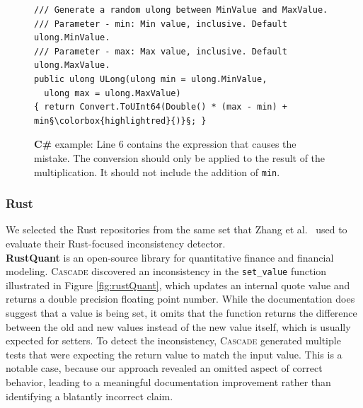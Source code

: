 \documentclass[acmsmall, screen]{acmart}
\newcommand{\tool}{\textsc{Cascade}\xspace}
\begin{document}

% 

\begin{figure}
    \centering
    \begin{lstlisting}[language=CSharp, escapechar=§]
/// Generate a random ulong between MinValue and MaxValue.
/// Parameter - min: Min value, inclusive. Default ulong.MinValue.
/// Parameter - max: Max value, inclusive. Default ulong.MaxValue.
public ulong ULong(ulong min = ulong.MinValue,
  ulong max = ulong.MaxValue)
{ return Convert.ToUInt64(Double() * (max - min) + min§\colorbox{highlightred}{)}§; }
\end{lstlisting}
    \caption{\textbf{C\#} example: Line 6 contains the expression that causes the mistake. The conversion should only be applied to the result of the multiplication. It should not include the addition of \texttt{min}.
}
    \label{fig:bogus}
\end{figure}


\subsubsection*{\textbf{Rust}}
We selected the Rust repositories from the same set that Zhang et al.~\cite{rustc4} used to evaluate their Rust-focused inconsistency detector. %
\\\textbf{RustQuant} is an open-source library for quantitative finance and financial modeling. \tool discovered an inconsistency in the \texttt{set\_value} function illustrated in Figure \ref{fig:rustQuant}, which updates an internal quote value and returns a double precision floating point number. While the documentation does suggest that a value is being set, it omits that the function returns the difference between the old and new values instead of the new value itself, which is usually expected for setters. To detect the inconsistency, \tool generated multiple tests that were expecting the return value to match the input value.
This is a notable case, because our approach revealed an omitted aspect of correct behavior, leading to a meaningful documentation improvement rather than identifying a blatantly incorrect claim.
\end{document}
